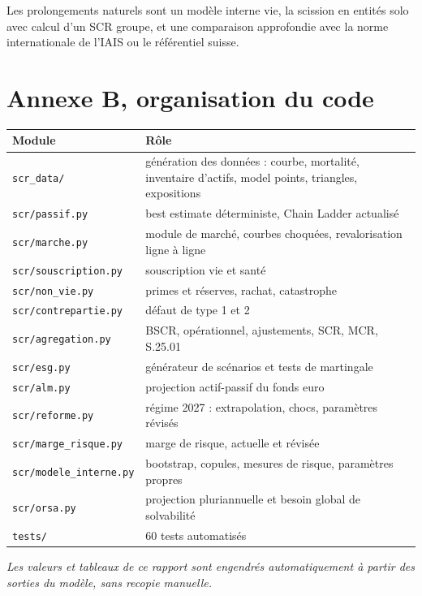 \documentclass[11pt,a4paper]{article}
\begin{document}
Les prolongements naturels sont un modèle interne vie, la scission en entités solo avec calcul d'un
SCR groupe, et une comparaison approfondie avec la norme internationale de l'IAIS ou le référentiel
suisse.

\newpage


\newpage
\section*{Annexe B, organisation du code}

\begin{table}[H]\centering\small
\begin{tabularx}{\linewidth}{lX}
\toprule
\textbf{Module} & \textbf{Rôle}\\
\midrule
\texttt{scr\_data/} & génération des données : courbe, mortalité, inventaire d'actifs, model
points, triangles, expositions\\
\texttt{scr/passif.py} & best estimate déterministe, Chain Ladder actualisé\\
\texttt{scr/marche.py} & module de marché, courbes choquées, revalorisation ligne à ligne\\
\texttt{scr/souscription.py} & souscription vie et santé\\
\texttt{scr/non\_vie.py} & primes et réserves, rachat, catastrophe\\
\texttt{scr/contrepartie.py} & défaut de type 1 et 2\\
\texttt{scr/agregation.py} & BSCR, opérationnel, ajustements, SCR, MCR, S.25.01\\
\texttt{scr/esg.py} & générateur de scénarios et tests de martingale\\
\texttt{scr/alm.py} & projection actif-passif du fonds euro\\
\texttt{scr/reforme.py} & régime 2027 : extrapolation, chocs, paramètres révisés\\
\texttt{scr/marge\_risque.py} & marge de risque, actuelle et révisée\\
\texttt{scr/modele\_interne.py} & bootstrap, copules, mesures de risque, paramètres propres\\
\texttt{scr/orsa.py} & projection pluriannuelle et besoin global de solvabilité\\
\texttt{tests/} & 60 tests automatisés\\
\bottomrule
\end{tabularx}
\end{table}

\vfill
\begin{center}\small\itshape
Les valeurs et tableaux de ce rapport sont engendrés automatiquement à partir des sorties du
modèle, sans recopie manuelle.
\end{center}
\end{document}
